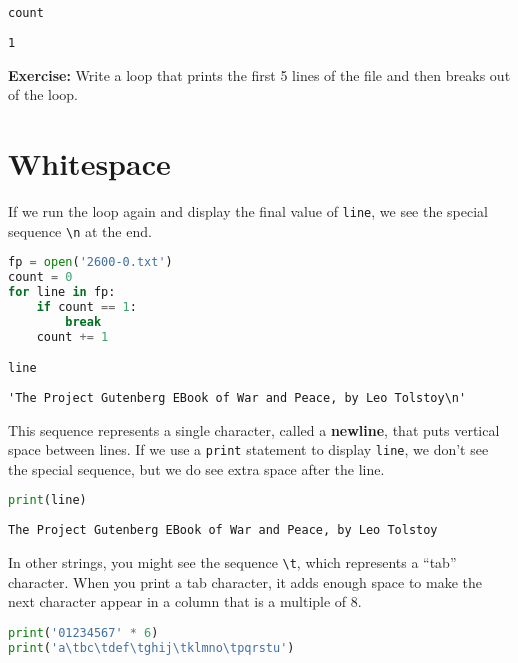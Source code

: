 \begin{lstlisting}[language=Python]
count
\end{lstlisting}

\begin{lstlisting}[]
1
\end{lstlisting}

\textbf{Exercise:} Write a loop that prints the first 5 lines of the
file and then breaks out of the loop.

\hypertarget{whitespace}{%
\section{Whitespace}\label{whitespace}}

If we run the loop again and display the final value of
\passthrough{\lstinline!line!}, we see the special sequence
\passthrough{\lstinline!\\n!} at the end.

\begin{lstlisting}[language=Python]
fp = open('2600-0.txt')
count = 0
for line in fp:
    if count == 1:
        break
    count += 1

line
\end{lstlisting}

\begin{lstlisting}[]
'The Project Gutenberg EBook of War and Peace, by Leo Tolstoy\n'
\end{lstlisting}

This sequence represents a single character, called a \textbf{newline},
that puts vertical space between lines. If we use a
\passthrough{\lstinline!print!} statement to display
\passthrough{\lstinline!line!}, we don't see the special sequence, but
we do see extra space after the line.

\begin{lstlisting}[language=Python]
print(line)
\end{lstlisting}

\begin{lstlisting}[]
The Project Gutenberg EBook of War and Peace, by Leo Tolstoy
\end{lstlisting}

In other strings, you might see the sequence
\passthrough{\lstinline!\\t!}, which represents a ``tab'' character.
When you print a tab character, it adds enough space to make the next
character appear in a column that is a multiple of 8.

\begin{lstlisting}[language=Python]
print('01234567' * 6)
print('a\tbc\tdef\tghij\tklmno\tpqrstu')
\end{lstlisting}

